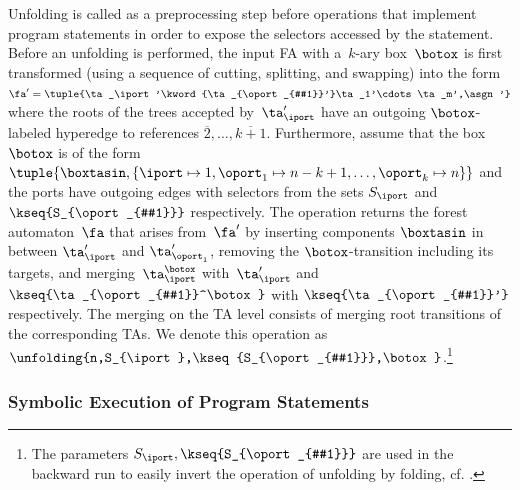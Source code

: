 Unfolding is called as a preprocessing step before operations that implement
program statements
in order to expose the selectors accessed by the statement. 
Before an unfolding is performed, the input FA with a~$k$-ary box~$\botox$ is first transformed
(using a sequence of cutting, splitting, and swapping)
into the form
$\fa' = \tuple{\ta_\iport'\kword{\ta_{\oport_{#1}}'}\ta_1'\cdots\ta_m',\asgn'}$
where
the roots of the trees accepted by~$\ta'_\iport$ have an outgoing
$\botox$-labeled hyperedge to references
$\overline {2},\ldots,{\overline{k+1}}$.
%
Furthermore, assume that the box $\botox$ is of the form
$\tuple{\boxtasin,\{\iport\mapsto 1,\oport_1 \mapsto n-k+1, \ldots, \oport_k \mapsto n\}}$
%
and 
%
the ports have outgoing edges with selectors from the sets 
$S_\iport$ and $\kseq{S_{\oport_{#1}}}$ respectively. 
%
The operation returns the forest automaton~$\fa$ that arises from~$\fa'$ by 
%
inserting components $\boxtasin$ in between $\ta'_\iport$ and
$\ta'_{\oport_{1}}$, 
removing the $\botox$-transition
including its targets, 
and merging~$\ta_\iport^\botox$ with~$\ta_\iport'$ and $\kseq{\ta_{\oport_{#1}}^\botox}$
with $\kseq{\ta_{\oport_{#1}}'}$ respectively.
The merging on the TA level consists of merging root transitions of the
corresponding TAs.
%
We denote this operation as $\unfolding{n,S_{\iport},\kseq{S_{\oport_{#1}}},\botox}$.\footnote{The parameters $S_{\iport},\kseq{S_{\oport_{#1}}}$ are used  in the backward run to easily invert the operation of unfolding by folding, cf. .}



\subsubsection*{Symbolic Execution of Program Statements}\label{sec:label}

